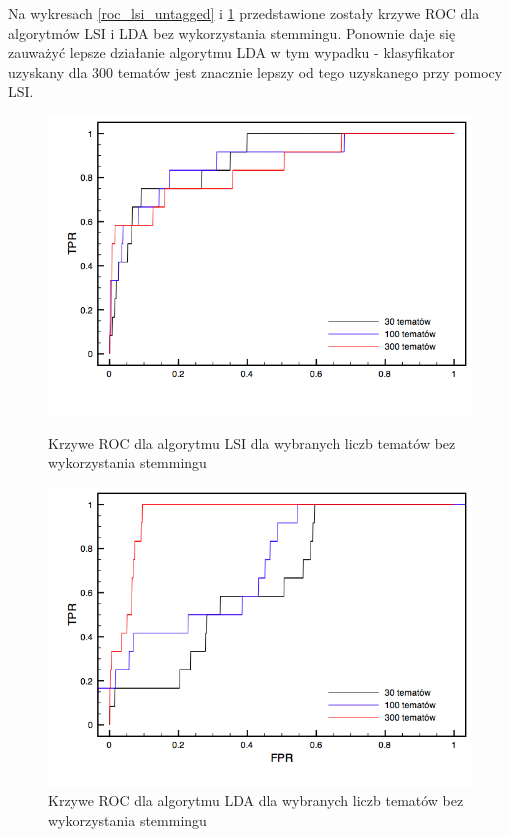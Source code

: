 \documentclass[11pt,a4paper]{article}
\begin{document}
Na wykresach \ref{roc_lsi_untagged} i \ref{roc_lda_untagged} przedstawione
zostały krzywe ROC dla algorytmów LSI i LDA bez wykorzystania stemmingu.
Ponownie daje się zauważyć lepsze działanie algorytmu LDA w tym wypadku -
klasyfikator uzyskany dla 300 tematów jest znacznie lepszy od tego uzyskanego
przy pomocy LSI.

\begin{figure}[h]
\includegraphics[width=\linewidth]{gfx/lsi_roc_untagged.png}
\caption{Krzywe ROC dla algorytmu LSI dla wybranych liczb tematów bez wykorzystania stemmingu}
\label{roc_lsi_untagged}

\includegraphics[width=\linewidth]{gfx/lda_roc_untagged.png}
\caption{Krzywe ROC dla algorytmu LDA dla wybranych liczb tematów bez wykorzystania stemmingu}
\label{roc_lda_untagged}
\end{figure}
\end{document}
